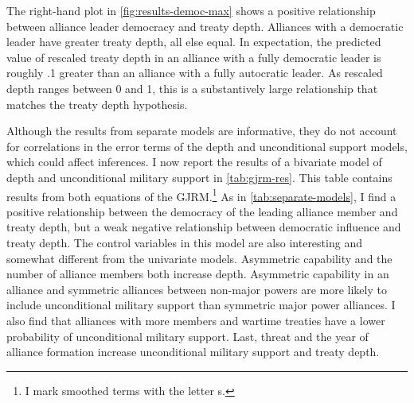 \documentclass[12pt]{article}
\begin{document}
The right-hand plot in \autoref{fig:results-democ-max} shows a positive relationship between alliance leader democracy and treaty depth.
Alliances with a democratic leader have greater treaty depth, all else equal. 
In expectation, the predicted value of rescaled treaty depth in an alliance with a fully democratic leader is roughly .1 greater than an alliance with a fully autocratic leader. 
As rescaled depth ranges between 0 and 1, this is a substantively large relationship that matches the treaty depth hypothesis.


Although the results from separate models are informative, they do not account for correlations in the error terms of the depth and unconditional support models, which could affect inferences. 
I now report the results of a bivariate model of depth and unconditional military support in \autoref{tab:gjrm-res}. 
This table contains results from both equations of the GJRM.\footnote{I mark smoothed terms with the letter s.}
As in \autoref{tab:separate-models}, I find a positive relationship between the democracy of the leading alliance member and treaty depth, but a weak negative relationship between democratic influence and treaty depth.  
The control variables in this model are also interesting and somewhat different from the univariate models.  
Asymmetric capability and the number of alliance members both increase depth. 
Asymmetric capability in an alliance and symmetric alliances between non-major powers are more likely to include unconditional military support than symmetric major power alliances. 
I also find that alliances with more members and wartime treaties have a lower probability of unconditional military support. 
Last, threat and the year of alliance formation increase unconditional military support and treaty depth. 
\end{document}
